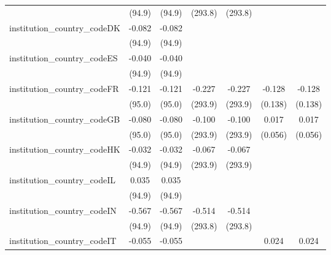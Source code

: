 \begin{tabular}{lcccccc}
                                         & (94.9)        & (94.9)        & (293.8)       & (293.8)       &               &   \\   
   institution\_country\_codeDK          & -0.082        & -0.082        &               &               &               &   \\   
                                         & (94.9)        & (94.9)        &               &               &               &   \\   
   institution\_country\_codeES          & -0.040        & -0.040        &               &               &               &   \\   
                                         & (94.9)        & (94.9)        &               &               &               &   \\   
   institution\_country\_codeFR          & -0.121        & -0.121        & -0.227        & -0.227        & -0.128        & -0.128\\   
                                         & (95.0)        & (95.0)        & (293.9)       & (293.9)       & (0.138)       & (0.138)\\   
   institution\_country\_codeGB          & -0.080        & -0.080        & -0.100        & -0.100        & 0.017         & 0.017\\   
                                         & (95.0)        & (95.0)        & (293.9)       & (293.9)       & (0.056)       & (0.056)\\   
   institution\_country\_codeHK          & -0.032        & -0.032        & -0.067        & -0.067        &               &   \\   
                                         & (94.9)        & (94.9)        & (293.9)       & (293.9)       &               &   \\   
   institution\_country\_codeIL          & 0.035         & 0.035         &               &               &               &   \\   
                                         & (94.9)        & (94.9)        &               &               &               &   \\   
   institution\_country\_codeIN          & -0.567        & -0.567        & -0.514        & -0.514        &               &   \\   
                                         & (94.9)        & (94.9)        & (293.8)       & (293.8)       &               &   \\   
   institution\_country\_codeIT          & -0.055        & -0.055        &               &               & 0.024         & 0.024\\   

\end{tabular}
